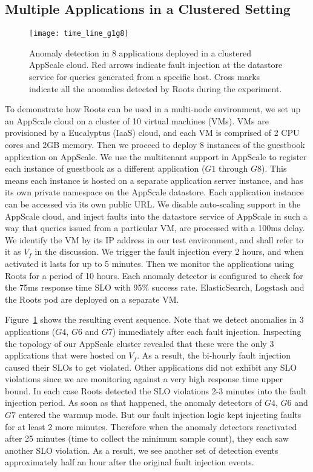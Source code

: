 \subsection{Multiple Applications in a Clustered Setting}
\begin{figure}
\centering
\texttt{[image: time\_line\_g1g8]}
\caption{Anomaly detection in 8 applications deployed in a clustered AppScale cloud. Red arrows
indicate fault injection at the datastore service for queries generated from a specific host. Cross
marks indicate all the anomalies detected by Roots during the experiment.}
\label{fig:time_line_g1g8}
\end{figure}

To demonstrate how Roots can be used in a multi-node environment, we set up an AppScale cloud
on a cluster of 10 virtual machines (VMs). VMs are provisioned by a Eucalyptus (IaaS)
cloud, and each VM is comprised of 2 CPU cores and 2GB memory. Then we proceed
to deploy 8 instances of the guestbook application on AppScale. We use the multitenant support
in AppScale to register each instance of guestbook as a different application ($G1$ through $G8$). This means each instance
is hosted on a separate application server instance, and has its own private namespace on the AppScale
datastore. Each application instance can be accessed via its own public URL. We disable auto-scaling support in 
the AppScale cloud, and inject faults into the datastore service of AppScale in such a way that queries
issued from a particular VM, are processed with a 100ms delay. We identify the VM by its IP address
in our test environment, and shall refer to it as $V_f$ in the discussion. We trigger
the fault injection every 2 hours, and when activated it lasts for up to 5 minutes. Then we monitor
the applications using Roots for a period of 10 hours. Each anomaly detector is configured
to check for the 75ms response time SLO with 95\% success rate. 
ElasticSearch, Logstash and the Roots pod are deployed on a separate VM. 

Figure~\ref{fig:time_line_g1g8} shows the resulting event sequence. Note that we detect anomalies 
in 3 applications ($G4$, $G6$ and $G7$) immediately after each fault injection. Inspecting the 
topology of our AppScale cluster revealed that these were the only 3 applications that were 
hosted on $V_f$. As a result, the bi-hourly fault injection caused their SLOs to
get violated. Other applications did not exhibit any SLO violations since we are monitoring against
a very high response time upper bound. In each case Roots detected the SLO violations 2-3 minutes into the fault injection
period. As soon as that happened, the anomaly detectors of $G4$, $G6$ and $G7$ entered the warmup mode.
But our fault injection logic kept injecting faults for at least 2 more minutes. Therefore when the anomaly detectors
reactivated after 25 minutes (time to collect the minimum sample count), they each saw another SLO
violation. As a result, we see another set of detection events approximately half an hour after the
original fault injection events.

